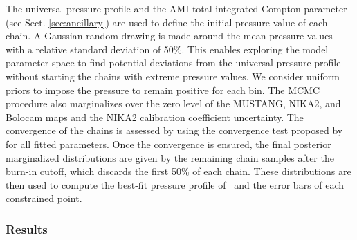 \documentclass[traditabstract]{aa}
\begin{document}
\indent The universal pressure profile \citep{arn10} and the AMI total integrated Compton parameter (see Sect. \ref{sec:ancillary}) are used to define the initial pressure value of each chain. A Gaussian random drawing is made around the mean pressure values with a relative standard deviation of 50\%. This enables exploring the model parameter space to find potential deviations from the universal pressure profile without starting the chains with extreme pressure values. We consider uniform priors to impose the pressure to remain positive for each bin. The MCMC procedure also marginalizes over the zero level of the MUSTANG, NIKA2, and Bolocam maps and the NIKA2 calibration coefficient uncertainty. The convergence of the chains is assessed by using the convergence test proposed by \cite{gel92} for all fitted parameters. Once the convergence is ensured, the final posterior marginalized distributions are given by the remaining chain samples after the burn-in cutoff, which discards the first 50\% of each chain. These distributions are then used to compute the best-fit pressure profile of \psz\ and the error bars of each constrained point.

\subsubsection{Results}\label{sec:MCMC_results}
\end{document}
